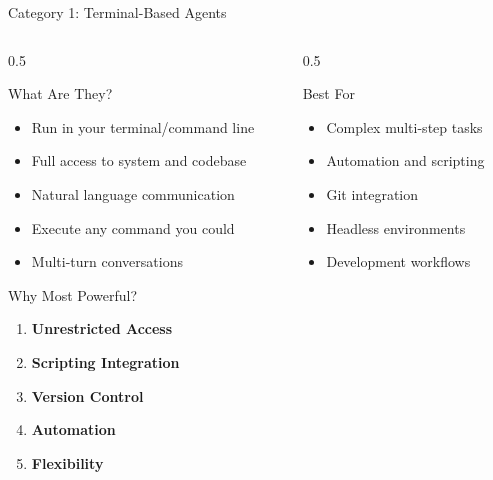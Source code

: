 \documentclass[aspectratio=169,11pt]{beamer}
\begin{document}
\begin{frame}{Category 1: Terminal-Based Agents}
    \begin{columns}[T]
        \begin{column}{0.5\textwidth}
            \begin{block}{What Are They?}
                \begin{itemize}
                    \item Run in your terminal/command line
                    \item Full access to system and codebase
                    \item Natural language communication
                    \item Execute any command you could
                    \item Multi-turn conversations
                \end{itemize}
            \end{block}

            \begin{block}{Why Most Powerful?}
                \begin{enumerate}
                    \item \textbf{Unrestricted Access}
                    \item \textbf{Scripting Integration}
                    \item \textbf{Version Control}
                    \item \textbf{Automation}
                    \item \textbf{Flexibility}
                \end{enumerate}
            \end{block}
        \end{column}
        \begin{column}{0.5\textwidth}
            \begin{exampleblock}{Best For}
                \begin{itemize}
                    \item Complex multi-step tasks
                    \item Automation and scripting
                    \item Git integration
                    \item Headless environments
                    \item Development workflows
                \end{itemize}
            \end{exampleblock}


\end{column}
\end{columns}
\end{frame}
\end{document}
